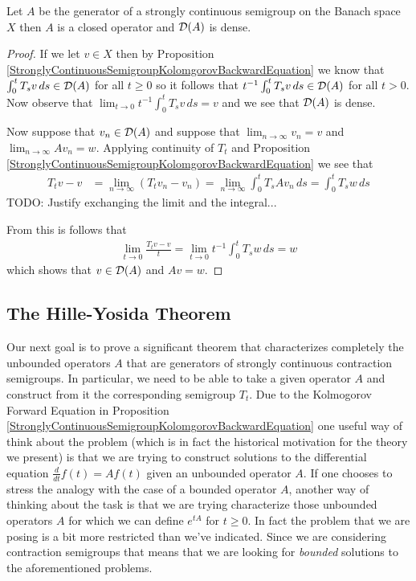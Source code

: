 \begin{cor}\label{StronglyContinuousSemigroupGeneratorClosedDomainDense}Let $A$ be the generator of a strongly continuous semigroup on the Banach space $X$ then $A$ is a closed operator and $\mathcal{D}(A)$ is dense.
\end{cor}
\begin{proof}
If we let $v \in X$ then by Proposition \ref{StronglyContinuousSemigroupKolomgorovBackwardEquation} we know that $\int_0^t T_s v \, ds \in \mathcal{D}(A)$ for all $t \geq 0$ so it follows that $t^{-1} \int_0^t T_s v \, ds \in \mathcal{D}(A)$ for all $t > 0$.  Now observe that $\lim_{t \to 0} t^{-1} \int_0^t T_s v \, ds = v$ and we see that $\mathcal{D}(A)$ is dense.

Now suppose that $v_n \in \mathcal{D}(A)$ and suppose that $\lim_{n \to \infty} v_n = v$ and $\lim_{n \to \infty} A v_n  = w$.  Applying continuity of $T_t$ and Proposition \ref{StronglyContinuousSemigroupKolomgorovBackwardEquation}  we see that 
\begin{align*}
T_t v - v &= \lim_{n \to \infty} (T_t v_n - v_n) = \lim_{n \to \infty} \int_0^t T_s A v_n \, ds = \int_0^t T_s w \, ds
\end{align*}
TODO: Justify exchanging the limit and the integral...

From this is follows that 
\begin{align*}
\lim_{t \to 0} \frac{T_t v - v}{t} = \lim_{t \to 0} t^{-1} \int_0^t T_s w \, ds = w
\end{align*}
which shows that $v \in \mathcal{D}(A)$ and $Av = w$.
\end{proof}

\subsection{The Hille-Yosida Theorem}

Our next goal is to prove a significant theorem that characterizes completely the unbounded operators $A$ that are generators of strongly continuous contraction semigroups.  In particular, we need to be able to take a given operator $A$ and construct from it the corresponding semigroup $T_t$.  Due to the Kolmogorov Forward Equation in Proposition \ref{StronglyContinuousSemigroupKolomgorovBackwardEquation} one useful way of think about the problem (which is in fact the historical motivation for the theory we present) is that we are trying to construct solutions to the differential equation $\frac{d}{dt} f(t) = A f(t)$ given an unbounded operator $A$.  If one chooses to stress the analogy with the case of a bounded operator $A$, another way of thinking about the task is that we are trying characterize those unbounded operators $A$ for which we can define $e^{tA}$ for $t \geq 0$.  In fact the problem that we are posing is a bit more restricted than we've indicated.  Since we are considering contraction semigroups that means that we are looking for \emph{bounded} solutions to the aforementioned problems.  

